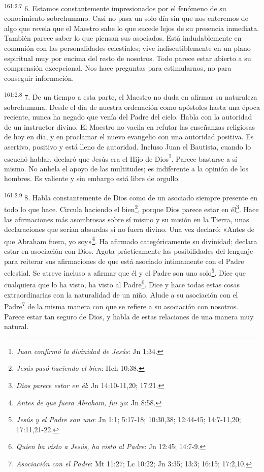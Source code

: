 \par
\textsuperscript{161:2.7} 6. Estamos constantemente impresionados por el fenómeno de su conocimiento sobrehumano. Casi no pasa un solo día sin que nos enteremos de algo que revela que el Maestro sabe lo que sucede lejos de su presencia inmediata. También parece saber lo que piensan sus asociados. Está indudablemente en comunión con las personalidades celestiales; vive indiscutiblemente en un plano espiritual muy por encima del resto de nosotros. Todo parece estar abierto a su comprensión excepcional. Nos hace preguntas para estimularnos, no para conseguir información.

\par
\textsuperscript{161:2.8} 7. De un tiempo a esta parte, el Maestro no duda en afirmar su naturaleza sobrehumana. Desde el día de nuestra ordenación como apóstoles hasta una época reciente, nunca ha negado que venía del Padre del cielo. Habla con la autoridad de un instructor divino. El Maestro no vacila en refutar las enseñanzas religiosas de hoy en día, y en proclamar el nuevo evangelio con una autoridad positiva. Es asertivo, positivo y está lleno de autoridad. Incluso Juan el Bautista, cuando lo escuchó hablar, declaró que Jesús era el Hijo de Dios\footnote{\textit{Juan confirmó la divinidad de Jesús}: Jn 1:34.}. Parece bastarse a sí mismo. No anhela el apoyo de las multitudes; es indiferente a la opinión de los hombres. Es valiente y sin embargo está libre de orgullo.

\par
\textsuperscript{161:2.9} 8. Habla constantemente de Dios como de un asociado siempre presente en todo lo que hace. Circula haciendo el bien\footnote{\textit{Jesús pasó haciendo el bien}: Hch 10:38.}, porque Dios parece estar en él\footnote{\textit{Dios parece estar en él}: Jn 14:10-11,20; 17:21.}. Hace las afirmaciones más asombrosas sobre sí mismo y su misión en la Tierra, unas declaraciones que serían absurdas si no fuera divino. Una vez declaró: «Antes de que Abraham fuera, yo soy»\footnote{\textit{Antes de que fuera Abraham, fui yo}: Jn 8:58.}. Ha afirmado categóricamente su divinidad; declara estar en asociación con Dios. Agota prácticamente las posibilidades del lenguaje para reiterar sus afirmaciones de que está asociado íntimamente con el Padre celestial. Se atreve incluso a afirmar que él y el Padre son uno solo\footnote{\textit{Jesús y el Padre son uno}: Jn 1:1; 5:17-18; 10:30,38; 12:44-45; 14:7-11,20; 17:11,21-22.}. Dice que cualquiera que lo ha visto, ha visto al Padre\footnote{\textit{Quien ha visto a Jesús, ha visto al Padre}: Jn 12:45; 14:7-9.}. Dice y hace todas estas cosas extraordinarias con la naturalidad de un niño. Alude a su asociación con el Padre\footnote{\textit{Asociación con el Padre}: Mt 11:27; Lc 10:22; Jn 3:35; 13:3; 16:15; 17:2,10.} de la misma manera con que se refiere a su asociación con nosotros. Parece estar tan seguro de Dios, y habla de estas relaciones de una manera muy natural.

